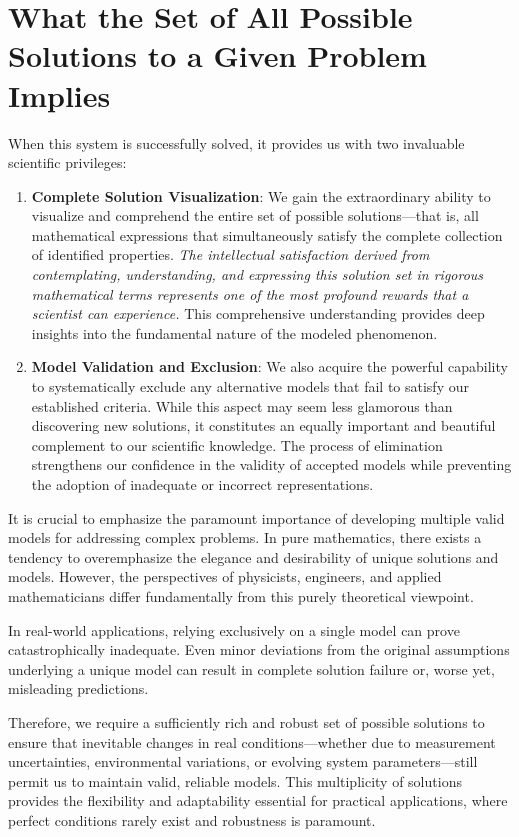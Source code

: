 \section{What the Set of All Possible Solutions to a Given Problem Implies}
When this system is successfully solved, it provides us with two invaluable scientific privileges:
\begin{enumerate}
\item \textbf{Complete Solution Visualization}: We gain the extraordinary ability to visualize and comprehend the entire set of possible solutions—that is, all mathematical expressions that simultaneously satisfy the complete collection of identified properties. {\it The intellectual satisfaction derived from contemplating, understanding, and expressing this solution set in rigorous mathematical terms represents one of the most profound rewards that a scientist can experience.} This comprehensive understanding provides deep insights into the fundamental nature of the modeled phenomenon.

\item \textbf{Model Validation and Exclusion}: We also acquire the powerful capability to systematically exclude any alternative models that fail to satisfy our established criteria. While this aspect may seem less glamorous than discovering new solutions, it constitutes an equally important and beautiful complement to our scientific knowledge. The process of elimination strengthens our confidence in the validity of accepted models while preventing the adoption of inadequate or incorrect representations.
\end{enumerate}

It is crucial to emphasize the paramount importance of developing multiple valid models for addressing complex problems. In pure mathematics, there exists a tendency to overemphasize the elegance and desirability of unique solutions and models. However, the perspectives of physicists, engineers, and applied mathematicians differ fundamentally from this purely theoretical viewpoint.

In real-world applications, relying exclusively on a single model can prove catastrophically inadequate. Even minor deviations from the original assumptions underlying a unique model can result in complete solution failure or, worse yet, misleading predictions.

Therefore, we require a sufficiently rich and robust set of possible solutions to ensure that inevitable changes in real conditions—whether due to measurement uncertainties, environmental variations, or evolving system parameters—still permit us to maintain valid, reliable models. This multiplicity of solutions provides the flexibility and adaptability essential for practical applications, where perfect conditions rarely exist and robustness is paramount.

